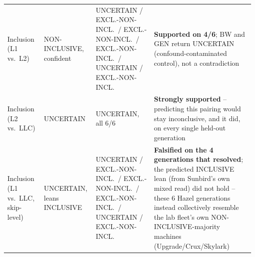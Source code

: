 \documentclass{article}
\begin{document}
\begin{table}[H]
{\begin{tabularx}{\textwidth}{|X|X|X|X|}
Inclusion (L1 vs.\ L2) & NON-INCLUSIVE, confident & UNCERTAIN / EXCL.-NON-INCL.\ / EXCL.-NON-INCL.\ / EXCL.-NON-INCL.\ / UNCERTAIN / EXCL.-NON-INCL. & \textbf{Supported on 4/6}; BW and GEN return UNCERTAIN (confound-contaminated control), not a contradiction\\
Inclusion (L2 vs.\ LLC) & UNCERTAIN & UNCERTAIN, all 6/6 & \textbf{Strongly supported} -- predicting this pairing would stay inconclusive, and it did, on every single held-out generation\\
Inclusion (L1 vs.\ LLC, skip-level) & UNCERTAIN, leans INCLUSIVE & UNCERTAIN / EXCL.-NON-INCL.\ / EXCL.-NON-INCL.\ / EXCL.-NON-INCL.\ / UNCERTAIN / EXCL.-NON-INCL. & \textbf{Falsified on the 4 generations that resolved}; the predicted INCLUSIVE lean (from Sunbird's own mixed read) did not hold -- these 6 Hazel generations instead collectively resemble the lab fleet's own NON-INCLUSIVE-majority machines (Upgrade/Crux/Skylark)\\
\hline
\end{tabularx}
}
\end{table}
\end{document}
